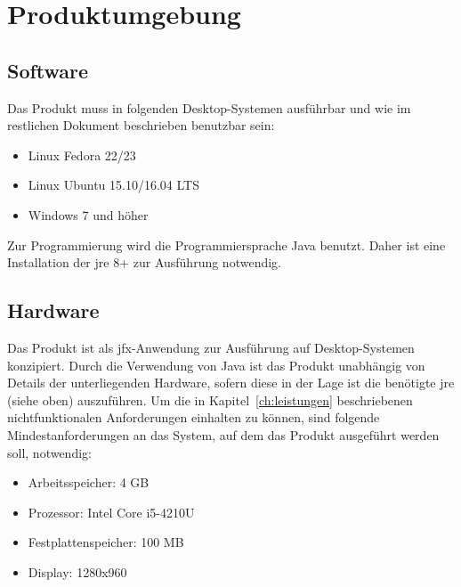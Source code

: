 \chapter{Produktumgebung}
\label{ch:umgebung}

\section{Software}
Das Produkt muss in folgenden Desktop-Systemen ausführbar und wie im restlichen Dokument beschrieben benutzbar sein:
\begin{itemize}
  \setlength\itemsep{0em}
  \item Linux Fedora 22/23 %
  \item Linux Ubuntu 15.10/16.04 LTS
  \item Windows 7 und höher
\end{itemize}
Zur Programmierung wird die Programmiersprache Java benutzt. Daher ist eine Installation der \gls{jre} 8+ zur Ausführung notwendig.

\section{Hardware}
Das Produkt ist als \gls{jfx}-Anwendung zur Ausführung auf Desktop-Systemen konzipiert.
Durch die Verwendung von Java ist das Produkt unabhängig von Details der unterliegenden Hardware, sofern diese in der Lage ist die benötigte \gls{jre} (siehe oben) auszuführen.
Um die in Kapitel~\ref{ch:leistungen} beschriebenen nichtfunktionalen Anforderungen einhalten zu können, sind folgende Mindestanforderungen an das System, auf dem das Produkt ausgeführt werden soll, notwendig:

\begin{itemize}
  \setlength\itemsep{0em}
  \item Arbeitsspeicher: 4 GB
  \item Prozessor: Intel Core i5-4210U %
  \item Festplattenspeicher: 100 MB
  \item Display: 1280x960
\end{itemize}
